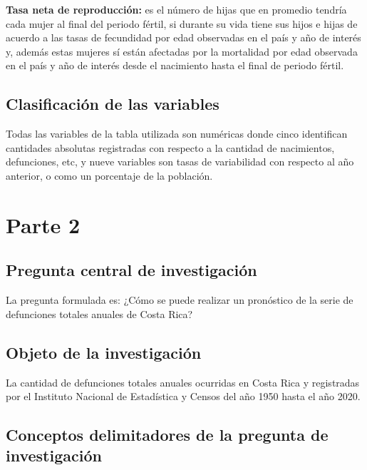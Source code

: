 \documentclass[
  letterpaper,
  onepage,
  openany]{report}
\begin{document}
\textbf{Tasa neta de reproducción:} es el número de hijas que en
promedio tendría cada mujer al final del periodo fértil, si durante su
vida tiene sus hijos e hijas de acuerdo a las tasas de fecundidad por
edad observadas en el país y año de interés y, además estas mujeres sí
están afectadas por la mortalidad por edad observada en el país y año de
interés desde el nacimiento hasta el final de periodo fértil.

\hypertarget{clasificaciuxf3n-de-las-variables}{%
\subsection{Clasificación de las
variables}\label{clasificaciuxf3n-de-las-variables}}

Todas las variables de la tabla utilizada son numéricas donde cinco
identifican cantidades absolutas registradas con respecto a la cantidad
de nacimientos, defunciones, etc, y nueve variables son tasas de
variabilidad con respecto al año anterior, o como un porcentaje de la
población.

\hypertarget{parte-2}{%
\section{Parte 2}\label{parte-2}}

\hypertarget{pregunta-central-de-investigaciuxf3n}{%
\subsection{Pregunta central de
investigación}\label{pregunta-central-de-investigaciuxf3n}}

La pregunta formulada es: ¿Cómo se puede realizar un pronóstico de la
serie de defunciones totales anuales de Costa Rica?

\hypertarget{objeto-de-la-investigaciuxf3n}{%
\subsection{Objeto de la
investigación}\label{objeto-de-la-investigaciuxf3n}}

La cantidad de defunciones totales anuales ocurridas en Costa Rica y
registradas por el Instituto Nacional de Estadística y Censos del año
1950 hasta el año 2020.

\hypertarget{conceptos-delimitadores-de-la-pregunta-de-investigaciuxf3n}{%
\subsection{Conceptos delimitadores de la pregunta de
investigación}\label{conceptos-delimitadores-de-la-pregunta-de-investigaciuxf3n}}
\end{document}
